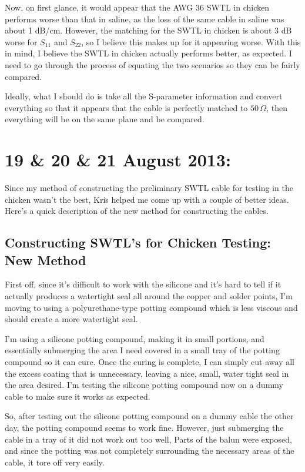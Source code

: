 \documentclass[12pt,onecolumn,titlepage]{article}
\begin{document}
Now, on first glance, it would appear that the AWG 36 SWTL in chicken performs worse than that in saline, as the loss of the same cable in saline was about 1 dB/cm. However, the matching for the SWTL in chicken is about 3 dB worse for $S_{11}$ and $S_{22}$, so I believe this makes up for it appearing worse. With this in mind, I believe the SWTL in chicken actually performs better, as expected. I need to go through the process of equating the two scenarios so they can be fairly compared. 

Ideally, what I should do is take all the S-parameter information and convert everything so that it appears that the cable is perfectly matched to $50 \, \Omega$, then everything will be on the same plane and be compared. 




\clearpage
\section{19 \& 20 \& 21 August 2013:}

\indent \indent Since my method of constructing the preliminary SWTL cable for testing in the chicken wasn't the best, Kris helped me come up with a couple of better ideas. Here's a quick description of the new method for constructing the cables.


\subsection{Constructing SWTL's for Chicken Testing: New Method}
\indent \indent First off, since it's difficult to work with the silicone and it's hard to tell if it actually produces a watertight seal all around the copper and solder points, I'm moving to using a polyurethane-type potting compound which is less viscous and should create a more watertight seal.

I'm using a silicone potting compound, making it in small portions, and essentially submerging the area I need covered in a small tray of the potting compound so it can cure. Once the curing is complete, I can simply cut away all the excess coating that is unnecessary, leaving a nice, small, water tight seal in the area desired. I'm testing the silicone potting compound now on a dummy cable to make sure it works as expected. 

So, after testing out the silicone potting compound on a dummy cable the other day, the potting compound seems to work fine. However, just submerging the cable in a tray of it did not work out too well, Parts of the balun were exposed, and since the potting was not completely surrounding the necessary areas of the cable, it tore off very easily. 
\end{document}
